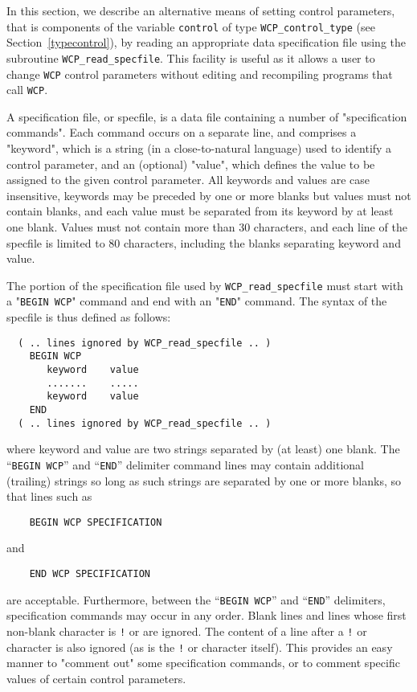 \documentclass{galahad}
\newcommand{\packagename}{WCP}
\begin{document}

\galfeatures
\noindent In this section, we describe an alternative means of setting 
control parameters, that is components of the variable {\tt control} of type
{\tt \packagename\_control\_type}
(see Section~\ref{typecontrol}), 
by reading an appropriate data specification file using the
subroutine {\tt \packagename\_read\_specfile}. This facility
is useful as it allows a user to change  {\tt \packagename} control parameters 
without editing and recompiling programs that call {\tt \packagename}.

A specification file, or specfile, is a data file containing a number of 
"specification commands". Each command occurs on a separate line, 
and comprises a "keyword", 
which is a string (in a close-to-natural language) used to identify a 
control parameter, and 
an (optional) "value", which defines the value to be assigned to the given
control parameter. All keywords and values are case insensitive, 
keywords may be preceded by one or more blanks but
values must not contain blanks, and
each value must be separated from its keyword by at least one blank.
Values must not contain more than 30 characters, and 
each line of the specfile is limited to 80 characters,
including the blanks separating keyword and value.

The portion of the specification file used by 
{\tt \packagename\_read\_specfile}
must start
with a "{\tt BEGIN \packagename}" command and end with an 
"{\tt END}" command.  The syntax of the specfile is thus defined as follows:
\begin{verbatim}
  ( .. lines ignored by WCP_read_specfile .. )
    BEGIN WCP
       keyword    value
       .......    .....
       keyword    value
    END 
  ( .. lines ignored by WCP_read_specfile .. )
\end{verbatim}
where keyword and value are two strings separated by (at least) one blank.
The ``{\tt BEGIN \packagename}'' and ``{\tt END}'' delimiter command lines 
may contain additional (trailing) strings so long as such strings are 
separated by one or more blanks, so that lines such as
\begin{verbatim}
    BEGIN WCP SPECIFICATION
\end{verbatim}
and
\begin{verbatim}
    END WCP SPECIFICATION
\end{verbatim}
are acceptable. Furthermore, 
between the
``{\tt BEGIN \packagename}'' and ``{\tt END}'' delimiters,
specification commands may occur in any order.  Blank lines and
lines whose first non-blank character is {\tt !} or {\tt *} are ignored. 
The content 
of a line after a {\tt !} or {\tt *} character is also 
ignored (as is the {\tt !} or {\tt *}
character itself). This provides an easy manner to "comment out" some 
specification commands, or to comment specific values 
of certain control parameters.  
\end{document}
